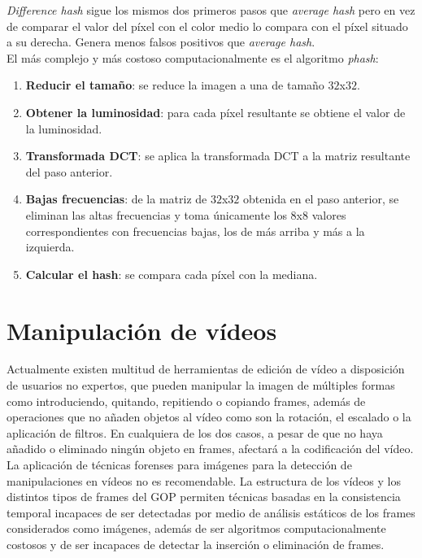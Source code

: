 \textit{Difference hash} sigue los mismos dos primeros pasos que \textit{average hash} pero en vez de comparar el valor del píxel con el color medio lo compara con el píxel situado a su derecha. Genera menos falsos positivos que \textit{average hash}. \\

El más complejo y más costoso computacionalmente es el algoritmo \textit{phash}:
\begin{enumerate}
\item \textbf{Reducir el tama\~no}: se reduce la imagen a una de tama\~no $32$x$32$.
\item \textbf{Obtener la luminosidad}: para cada píxel resultante se obtiene el valor de la luminosidad.
\item \textbf{Transformada DCT}: se aplica la transformada DCT a la matriz resultante del paso anterior.
\item \textbf{Bajas frecuencias}: de la matriz de $32$x$32$ obtenida en el paso anterior, se eliminan las altas frecuencias y toma únicamente los $8$x$8$ valores correspondientes con frecuencias bajas, los de más arriba y más a la izquierda.
\item \textbf{Calcular el hash}: se compara cada píxel con la mediana.
\end{enumerate}

\section{Manipulación de vídeos}
Actualmente existen multitud de herramientas de edición de vídeo a disposición de usuarios no expertos, que pueden manipular la imagen de múltiples formas como introduciendo, quitando, repitiendo o copiando frames, además de operaciones que no a\~naden objetos al vídeo como son la rotación, el escalado o la aplicación de filtros. En cualquiera de los dos casos, a pesar de que no haya a\~nadido o eliminado ningún objeto en frames, afectará a la codificación del vídeo. \\

La aplicación de técnicas forenses para imágenes para la detección de manipulaciones en vídeos no es recomendable. La estructura de los vídeos y los distintos tipos de frames del GOP permiten técnicas basadas en la consistencia temporal incapaces de ser detectadas por medio de análisis estáticos de los frames considerados como imágenes, además de ser algoritmos computacionalmente costosos y de ser incapaces de detectar la inserción o eliminación de frames\cite{bestagini:2012}. \\

